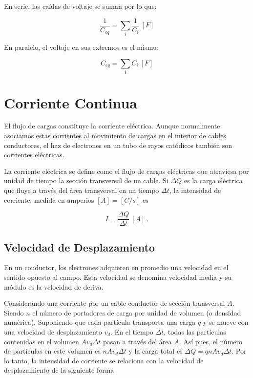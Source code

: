 \documentclass{tufte-handout}
\begin{document}
En serie, las caídas de voltaje se suman por lo que:

\begin{equation}
\frac{1}{C_{eq}} = \sum_i \frac{1}{C_i}~[F]
\end{equation}

En paralelo, el voltaje en sus extremos es el mismo:

\begin{equation}
C_{eq} = \sum_i C_i~[F]
\end{equation}

\clearpage

\section{Corriente Continua}

El flujo de cargas constituye la corriente eléctrica. Aunque normalmente asociamos estas corrientes al movimiento de cargas en el interior de cables conductores, el haz de electrones en un tubo de rayos catódicos también son corrientes eléctricas.


La corriente eléctrica se define como el flujo de cargas eléctricas que atraviesa por unidad de tiempo la sección transversal de un cable. Si $\Delta Q$ es la carga eléctrica que fluye a través del área transversal en un tiempo $\Delta t$, la intensidad de corriente, medida en amperios $[A] = [C/s]$ es

\begin{equation}
I = \frac{\Delta Q}{\Delta t}~[A]~.
\end{equation}

\subsection{Velocidad de Desplazamiento}

En un conductor, los electrones adquieren en promedio una velocidad en el sentido opuesto al campo. Esta velocidad se denomina velocidad media y su módulo es la velocidad de deriva.

Considerando una corriente por un cable conductor de sección transversal $A$. Siendo $n$ el número de portadores de carga por unidad de volumen (o densidad numérica). Suponiendo que cada partícula transporta una carga $q$ y se mueve con una velocidad de desplazamiento $v_d$. En el tiempo $\Delta t$, todas las partículas contenidas en el volumen $Av_d\Delta t$ pasan a través del área $A$. Así pues, el número de partículas en este volumen es $nAv_d\Delta t$ y la carga total es $\Delta Q = qnAv_d\Delta t$. Por lo tanto, la intensidad de corriente se relaciona con la velocidad de desplazamiento de la siguiente forma
\end{document}
